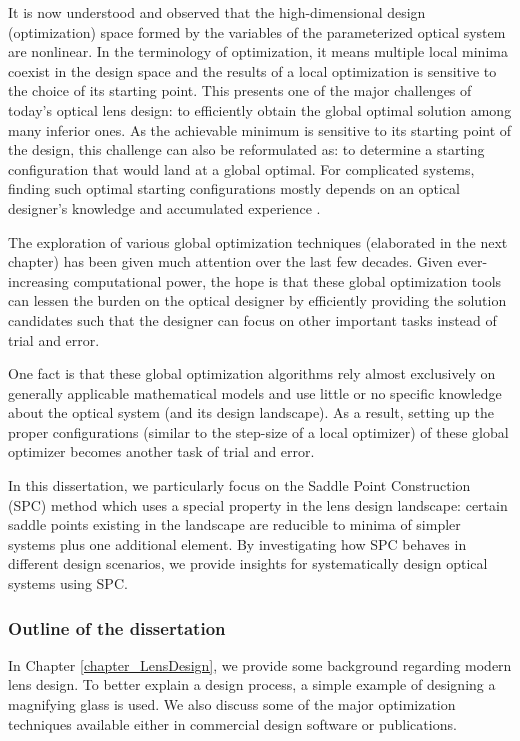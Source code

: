It is now understood and observed that the high-dimensional design (optimization) space formed by the variables of the parameterized optical system are nonlinear. In the terminology of optimization, it means multiple local minima coexist in the design space and the results of a local optimization is sensitive to the choice of its starting point. This presents one of the major challenges of today's optical lens design: to efficiently obtain the global optimal solution among many inferior ones. As the achievable minimum is sensitive to its starting point of the design, this challenge can also be reformulated as: to determine a starting configuration that would land at a global optimal. For complicated systems, finding such optimal starting configurations mostly depends on an optical designer's knowledge and accumulated experience \cite{LivshitsQA2013}\cite{Shafer1995_moreless}. 

The exploration of various global optimization techniques (elaborated in the next chapter) has been given much attention over the last few decades. Given ever-increasing computational power, the hope is that these global optimization tools can lessen the burden on the optical designer by efficiently providing the solution candidates such that the designer can focus on other important tasks instead of trial and error. 

One fact is that these global optimization algorithms rely almost exclusively on generally applicable mathematical models and use little or no specific knowledge about the optical system (and its design landscape). As a result, setting up the proper configurations (similar to the step-size of a local optimizer) of these global optimizer becomes another task of trial and error. 

In this dissertation, we particularly focus on the Saddle Point Construction (SPC) method which uses a special property in the lens design landscape: certain saddle points existing in the landscape are reducible to minima of simpler systems plus one additional element. By investigating how SPC behaves in different design scenarios, we provide insights for systematically design optical systems using SPC. 



\subsubsection{Outline of the dissertation}
In Chapter \ref{chapter_LensDesign}, we provide some background regarding modern lens design. To better explain a design process, a simple example of designing a magnifying glass is used. We also discuss some of the major optimization techniques available either in commercial design software or publications. 

